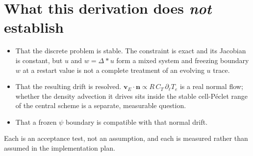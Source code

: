 \documentclass[11pt,a4paper]{article}
\begin{document}
\section{What this derivation does \emph{not} establish}

\begin{itemize}\itemsep2pt
\item That the discrete problem is stable. The constraint is exact and its Jacobian is constant,
      but $u$ and $w=\Delta^\!*u$ form a mixed system and freezing boundary $w$ at a restart value
      is not a complete treatment of an evolving $u$ trace.
\item That the resulting drift is resolved. $\bm{v}_E\cdot\bm{n}\propto R\,C_T\,\partial_\ell T_e$
      is a real normal flow; whether the density advection it drives sits inside the stable
      cell-P\'eclet range of the central scheme is a separate, measurable question.
\item That a frozen $\psi$ boundary is compatible with that normal drift.
\end{itemize}
Each is an acceptance test, not an assumption, and each is measured rather than assumed in the
implementation plan.
\end{document}
